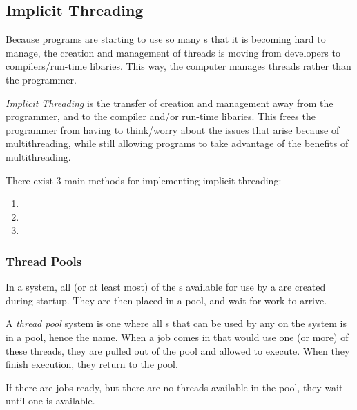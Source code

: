 \subsection{Implicit Threading}\label{subsec:Implicit_Threading}
Because programs are starting to use so many s that it is becoming hard to manage, the creation and management of threads is moving from developers to compilers/run-time libaries.
This way, the computer manages threads rather than the programmer.

\begin{definition}\label{def:Implicit_Threading}
  \emph{Implicit Threading} is the transfer of  creation and management away from the programmer, and to the compiler and/or run-time libaries.
  This frees the programmer from having to think/worry about the issues that arise because of multithreading, while still allowing programs to take advantage of the benefits of multithreading.
\end{definition}

There exist 3 main methods for implementing implicit threading:
\begin{enumerate}[noitemsep]
\item {}
\item {}
\item {}
\end{enumerate}

\subsubsection{Thread Pools}\label{subsubsec:Thread_Pools}
In a  system, all (or at least most) of the s available for use by a  are created during startup.
They are then placed in a pool, and wait for work to arrive.

\begin{definition}\label{def:Thread_Pool}
  A \emph{thread pool} system is one where all s that can be used by any  on the system is in a pool, hence the name.
  When a job comes in that would use one (or more) of these threads, they are pulled out of the pool and allowed to execute.
  When they finish execution, they return to the pool.

  If there are jobs ready, but there are no threads available in the pool, they wait until one is available.
\end{definition}

